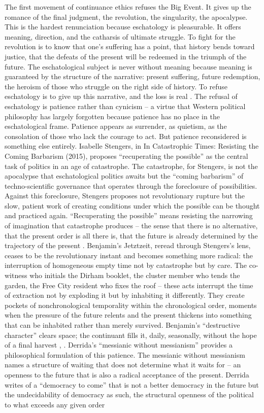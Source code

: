 The first movement of continuance ethics refuses the Big Event. It gives up the romance of the final judgment, the revolution, the singularity, the apocalypse. This is the hardest renunciation because eschatology is pleasurable. It offers meaning, direction, and the catharsis of ultimate struggle. To fight for the revolution is to know that one’s suffering has a point, that history bends toward justice, that the defeats of the present will be redeemed in the triumph of the future. The eschatological subject is never without meaning because meaning is guaranteed by the structure of the narrative: present suffering, future redemption, the heroism of those who struggle on the right side of history. To refuse eschatology is to give up this narrative, and the loss is real \cite[pp.~33-52]{stengers_2015}. The refusal of eschatology is patience rather than cynicism – a virtue that Western political philosophy has largely forgotten because patience has no place in the eschatological frame. Patience appears as surrender, as quietism, as the consolation of those who lack the courage to act. But patience reconsidered is something else entirely. Isabelle Stengers, in In Catastrophic Times: Resisting the Coming Barbarism (2015), proposes “recuperating the possible” as the central task of politics in an age of catastrophe. The catastrophe, for Stengers, is not the apocalypse that eschatological politics awaits but the “coming barbarism” of techno-scientific governance that operates through the foreclosure of possibilities. Against this foreclosure, Stengers proposes not revolutionary rupture but the slow, patient work of creating conditions under which the possible can be thought and practiced again. “Recuperating the possible” means resisting the narrowing of imagination that catastrophe produces – the sense that there is no alternative, that the present order is all there is, that the future is already determined by the trajectory of the present \cite[pp.~21-32]{stengers_2015}. Benjamin’s Jetztzeit, reread through Stengers’s lens, ceases to be the revolutionary instant and becomes something more radical: the interruption of homogeneous empty time not by catastrophe but by care. The co-witness who initials the Dirham booklet, the cluster member who tends the garden, the Free City resident who fixes the roof – these acts interrupt the time of extraction not by exploding it but by inhabiting it differently. They create pockets of nonchronological temporality within the chronological order, moments when the pressure of the future relents and the present thickens into something that can be inhabited rather than merely survived. Benjamin’s “destructive character” clears space; the continuant fills it, daily, seasonally, without the hope of a final harvest \cite{benjamin_1940}, \cite{stengers_2015}. Derrida’s “messianic without messianism” provides a philosophical formulation of this patience. The messianic without messianism names a structure of waiting that does not determine what it waits for – an openness to the future that is also a radical acceptance of the present. Derrida writes of a “democracy to come” that is not a better democracy in the future but the undecidability of democracy as such, the structural openness of the political to what exceeds any given order 